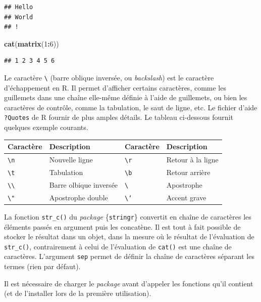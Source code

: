 \documentclass[
  11pt,
]{book}
\newenvironment{Shaded}{\begin{snugshade}}{\end{snugshade}}
\newcommand{\DecValTok}[1]{\textcolor[rgb]{0.00,0.00,0.81}{#1}}
\newcommand{\KeywordTok}[1]{\textcolor[rgb]{0.13,0.29,0.53}{\textbf{#1}}}
\newcommand{\NormalTok}[1]{#1}
\newcommand{\OperatorTok}[1]{\textcolor[rgb]{0.81,0.36,0.00}{\textbf{#1}}}
\numberwithin{equation}{section}
\newcounter{countremarque}
\newenvironment{remarque}{%
 \refstepcounter{countremarque}
    \begin{tcolorbox}[width=\linewidth, colback=blue!3, boxrule=0.5pt,arc=0pt,title = Remarque \thecountremarque]
    }%
    {
    \end{tcolorbox}
    }
\numberwithin{countremarque}{section}
\begin{document}
\begin{lstlisting}
## Hello
## World
## !
\end{lstlisting}

\begin{Shaded}
\begin{Highlighting}[]
\KeywordTok{cat}\NormalTok{(}\KeywordTok{matrix}\NormalTok{(}\DecValTok{1}\OperatorTok{:}\DecValTok{6}\NormalTok{))}
\end{Highlighting}
\end{Shaded}

\begin{lstlisting}
## 1 2 3 4 5 6
\end{lstlisting}

\begin{remarque}
Le caractère \texttt{\textbackslash{}} (barre oblique inversée, ou \emph{backslash}) est le caractère d'échappement en R. Il permet d'afficher certains caractères, comme les guillemets dans une chaîne elle-même définie à l'aide de guillemets, ou bien les caractères de contrôle, comme la tabulation, le saut de ligne, etc. Le fichier d'aide \texttt{?Quotes} de R fournir de plus amples détails. Le tableau ci-dessous fournit quelques exemple courants.

\begin{longtable}[]{@{}llll@{}}
\toprule
Caractère & Description & Caractère & Description\tabularnewline
\midrule
\endhead
\texttt{\textbackslash{}n} & Nouvelle ligne & \texttt{\textbackslash{}r} & Retour à la ligne\tabularnewline
\texttt{\textbackslash{}t} & Tabulation & \texttt{\textbackslash{}b} & Retour arrière\tabularnewline
\texttt{\textbackslash{}\textbackslash{}} & Barre olbique inversée & \texttt{\textbackslash{}\textquotesingle{}} & Apostrophe\tabularnewline
\texttt{\textbackslash{}"} & Apostrophe double & \texttt{\textbackslash{}‘} & Accent grave\tabularnewline
\bottomrule
\end{longtable}
\end{remarque}

La fonction \texttt{str\_c()} du \emph{package} \{\texttt{stringr}\} convertit en chaîne de caractères les éléments passés en argument puis les concatène. Il est tout à fait possible de stocker le résultat dans un objet, dans la mesure où le résultat de l'évaluation de \texttt{str\_c()}, contrairement à celui de l'évaluation de \texttt{cat()} est une chaîne de caractères. L'argument \texttt{sep} permet de définir la chaîne de caractères séparant les termes (rien par défaut).

Il est nécessaire de charger le \emph{package} avant d'appeler les fonctions qu'il contient (et de l'installer lors de la première utilisation).
\end{document}
